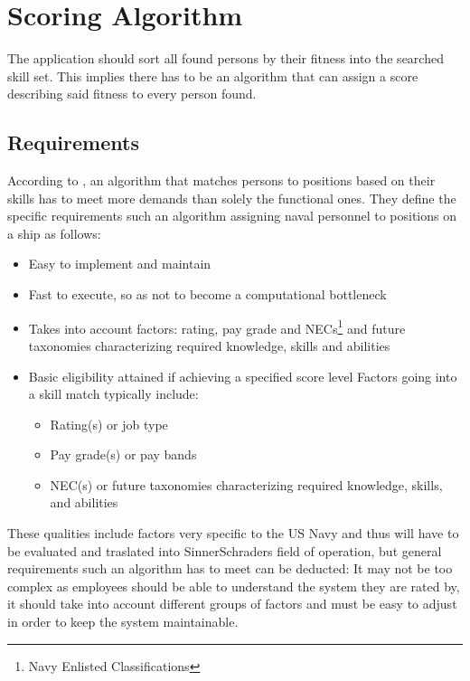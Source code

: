 \section{Scoring Algorithm}
The application should sort all found persons by their fitness into the searched skill set.
This implies there has to be an algorithm that can assign a score describing said fitness to every person found.

\subsection{Requirements}
According to \cite{USN}, an algorithm that matches persons to positions based on their skills has to meet more demands than solely the functional ones. They define the specific requirements such an algorithm assigning naval personnel to positions on a ship as follows:
\begin{itemize}
  \item Easy to implement and maintain
  \item Fast to execute, so as not to become a computational bottleneck
  \item Takes into account factors: rating, pay grade and NECs\footnote{Navy Enlisted Classifications} and future taxonomies characterizing required knowledge, skills and abilities
  \item Basic eligibility attained if achieving a specified score level Factors going into a skill match typically include:
  \begin{itemize}
    \item Rating(s) or job type
    \item Pay grade(s) or pay bands
    \item NEC(s) or future taxonomies characterizing required knowledge, skills, and abilities
  \end{itemize}
\end{itemize}\cite[P. 14]{USN}

These qualities include factors very specific to the US Navy and thus will have to be evaluated and traslated into SinnerSchraders field of operation, but general requirements such an algorithm has to meet can be deducted: It may not be too complex as employees should be able to understand the system they are rated by, it should take into account different groups of factors and must be easy to adjust in order to keep the system maintainable.


